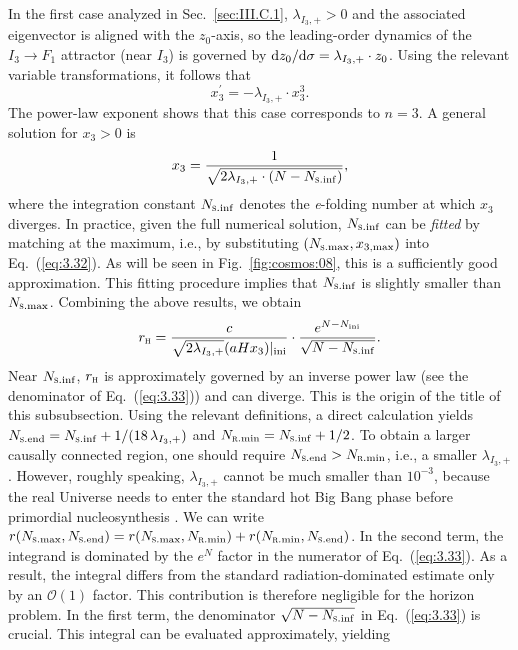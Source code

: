 \documentclass[aps,prd,twocolumn]{revtex4-2}
\newcommand\dx{{\rm d}}
\newcommand\subH{\textsc{h}}
\newcommand\subini{{\rm ini}}
\newcommand\subRmin{{\rm \textsc{r}.min}}
\newcommand\subSmax{{\rm \textsc{s}.max}}
\newcommand\subSend{{\rm \textsc{s}.end}}
\newcommand\subSinf{{\rm \textsc{s}.inf}}
\newcommand\submax{{\rm max}}
\begin{document}
In the first case analyzed in Sec.~\ref{sec:III.C.1}, $\lambda_{I_3,+}>0$ and the associated eigenvector is aligned with the $z_0$-axis, so the leading-order dynamics of the $I_3\rightarrow F_1$ attractor (near $I_3$) is governed by $\dx z_0/\dx\sigma = \lambda_{I_3,+}\cdot z_0$. Using the relevant variable transformations, it follows that
\begin{equation}
  x_3^\prime = - \lambda_{I_3,+} \cdot x_3^3.
\end{equation}
The power-law exponent shows that this case corresponds to $n=3$. A general solution for $x_3>0$ is  
\begin{equation}\label{eq:3.32}
  x_3 = \frac{1}{\sqrt{2\lambda_{I_3,+}\cdot(N-N_\subSinf)}},
\end{equation}
where the integration constant $N_\subSinf$ denotes the \textit{e}-folding number at which $x_3$ diverges. In practice, given the full numerical solution, $N_\subSinf$ can be \textit{fitted} by matching at the maximum, i.e., by substituting $(N_\subSmax,x_{3,\submax})$ into Eq.~(\ref{eq:3.32}). As will be seen in Fig.~\ref{fig:cosmos:08}, this is a sufficiently good approximation. This fitting procedure implies that $N_\subSinf$ is slightly smaller than $N_\subSmax$. Combining the above results, we obtain
\begin{equation}\label{eq:3.33}
  r_\subH = \frac{c}{\sqrt{2\lambda_{I_3,+}}(aH x_3)|_\subini} \cdot \frac{e^{N-N_\subini}}{\sqrt{N-N_\subSinf}}.
\end{equation}
Near $N_\subSinf$, $r_\subH$ is approximately governed by an inverse power law (see the denominator of Eq.~(\ref{eq:3.33})) and can diverge. This is the origin of the title of this subsubsection. Using the relevant definitions, a direct calculation yields $N_\subSend=N_\subSinf+1/(18\,\lambda_{I_3,+})$ and $N_\subRmin=N_\subSinf+1/2$. To obtain a larger causally connected region, one should require $N_\subSend>N_\subRmin$, i.e., a smaller $\lambda_{I_3,+}$. However, roughly speaking, $\lambda_{I_3,+}$ cannot be much smaller than $10^{-3}$, because the real Universe needs to enter the standard hot Big Bang phase before primordial nucleosynthesis \cite{Pitrou2018.PhysRep.754.1,Tian2022.PRD.106.043524}. We can write $r(N_\subSmax,N_\subSend) = r(N_\subSmax,N_\subRmin) + r(N_\subRmin,N_\subSend)$. In the second term, the integrand is dominated by the $e^N$ factor in the numerator of Eq.~(\ref{eq:3.33}). As a result, the integral differs from the standard radiation-dominated estimate only by an $\mathcal{O}(1)$ factor. This contribution is therefore negligible for the horizon problem. In the first term, the denominator $\sqrt{N-N_\subSinf}$ in Eq.~(\ref{eq:3.33}) is crucial. This integral can be evaluated approximately, yielding
\end{document}
